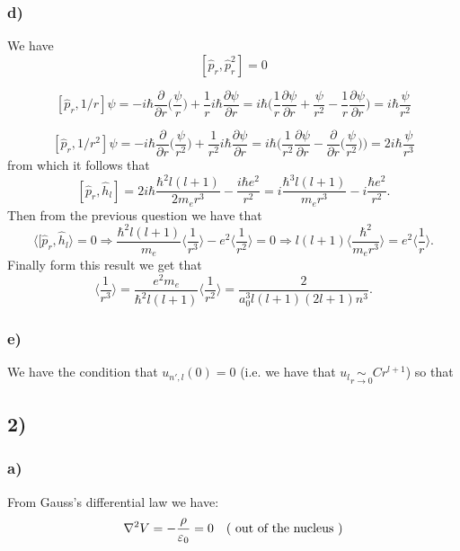 \documentclass[10pt,a4paper]{book}
\newcommand{\p}{\partial}
\begin{document}
\subsubsection*{d)}
We have
$$[\hat{p}_r,\hat{p}_r^2]=0
$$

$$[\hat{p}_r,1/r]\psi=-i\hbar \frac{\p}{\p r}\bigg(\frac{\psi}{r}\bigg)+\frac{1}{r}i\hbar\frac{\p \psi}{\p r}=i\hbar\bigg(\frac{1}{r}\frac{\p\psi}{\p r}+\frac{\psi}{r^2}-\frac{1}{r}\frac{\p\psi}{\p r}\bigg)=i\hbar\frac{\psi}{r^2}$$

$$[\hat{p}_r,1/r^2]\psi=-i\hbar \frac{\p}{\p r}\bigg(\frac{\psi}{r^2}\bigg)+\frac{1}{r^2}i\hbar\frac{\p \psi}{\p r}=i\hbar\bigg(\frac{1}{r^2}\frac{\p\psi}{\p r}-\frac{\p}{\p r}\bigg(\frac{\psi}{r^2}\bigg)\bigg)=2i\hbar\frac{\psi}{r^3}$$
from which it follows that 
$$[\hat{p}_r,\hat{h}_l]=2i\hbar\frac{\hbar^2l(l+1)}{2m_er^3}-\frac{i\hbar e^2}{r^2}=i\frac{\hbar^3l(l+1)}{m_er^3}-i\frac{\hbar e^2}{r^2}.$$
Then from the previous question we have that 
$$\langle [\hat{p}_r,\hat{h}_l\rangle=0\Rightarrow\frac{\hbar^2l(l+1)}{m_e}\bigg\langle\frac{1}{r^3}\bigg\rangle-e^2\bigg\langle\frac{1}{r^2}\bigg\rangle=0\Rightarrow l(l+1)\bigg\langle \frac{\hbar^2}{m_er^3}\bigg\rangle=e^2\bigg\langle\frac{1}{r}\bigg\rangle.$$
Finally form this result we get that 
$$\bigg\langle\frac{1}{r^3}\bigg\rangle =\frac{e^2m_e}{\hbar^2l(l+1)}\bigg\langle\frac{1}{r^2}\bigg\rangle=\frac{2}{a_0^3l(l+1)(2l+1)n^3}.$$

\subsubsection*{e)}
We have the condition that $u_{n',l}(0)=0$ (i.e. we have that $u_l\underset{r\to0}{\sim}Cr^{l+1}$) so that 


\subsection*{2)}

\subsubsection{a)}

From Gauss's differential law we have:
\[
\laplacian V = -\frac{\rho}{\varepsilon_0} = 0 \quad (\text{ out of the nucleus } )
\]
\end{document}
